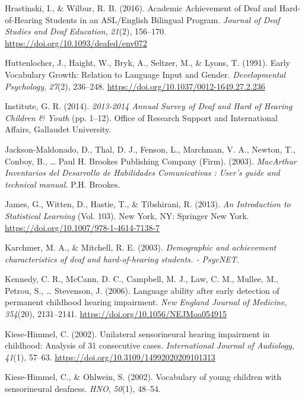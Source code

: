 \documentclass[english,man]{apa6}
\begin{document}
\leavevmode\hypertarget{ref-hrastinski2016}{}%
Hrastinski, I., \& Wilbur, R. B. (2016). Academic Achievement of Deaf and Hard-of-Hearing Students in an ASL/English Bilingual Program. \emph{Journal of Deaf Studies and Deaf Education}, \emph{21}(2), 156--170. \url{https://doi.org/10.1093/deafed/env072}

\leavevmode\hypertarget{ref-huttenlocher1991}{}%
Huttenlocher, J., Haight, W., Bryk, A., Seltzer, M., \& Lyons, T. (1991). Early Vocabulary Growth: Relation to Language Input and Gender. \emph{Developmental Psychology}, \emph{27}(2), 236--248. \url{https://doi.org/10.1037/0012-1649.27.2.236}

\leavevmode\hypertarget{ref-gallaudetresearchinstitute2014}{}%
Institute, G. R. (2014). \emph{2013-2014 Annual Survey of Deaf and Hard of Hearing Children \& Youth} (pp. 1--12). Office of Research Support and International Affairs, Gallaudet University.

\leavevmode\hypertarget{ref-jackson-maldonado2003}{}%
Jackson-Maldonado, D., Thal, D. J., Fenson, L., Marchman, V. A., Newton, T., Conboy, B., \ldots{} Paul H. Brookes Publishing Company (Firm). (2003). \emph{MacArthur Inventarios del Desarrollo de Habilidades Comunicativas : User's guide and technical manual}. P.H. Brookes.

\leavevmode\hypertarget{ref-james2013}{}%
James, G., Witten, D., Hastie, T., \& Tibshirani, R. (2013). \emph{An Introduction to Statistical Learning} (Vol. 103). New York, NY: Springer New York. \url{https://doi.org/10.1007/978-1-4614-7138-7}

\leavevmode\hypertarget{ref-karchmer2003}{}%
Karchmer, M. A., \& Mitchell, R. E. (2003). \emph{Demographic and achievement characteristics of deaf and hard-of-hearing students. - PsycNET}.

\leavevmode\hypertarget{ref-kennedy2006}{}%
Kennedy, C. R., McCann, D. C., Campbell, M. J., Law, C. M., Mullee, M., Petrou, S., \ldots{} Stevenson, J. (2006). Language ability after early detection of permanent childhood hearing impairment. \emph{New England Journal of Medicine}, \emph{354}(20), 2131--2141. \url{https://doi.org/10.1056/NEJMoa054915}

\leavevmode\hypertarget{ref-kiese-himmel2002}{}%
Kiese-Himmel, C. (2002). Unilateral sensorineural hearing impairment in childhood: Analysis of 31 consecutive cases. \emph{International Journal of Audiology}, \emph{41}(1), 57--63. \url{https://doi.org/10.3109/14992020209101313}

\leavevmode\hypertarget{ref-kiese-himmel2002a}{}%
Kiese-Himmel, C., \& Ohlwein, S. (2002). Vocabulary of young children with sensorineural deafness. \emph{HNO}, \emph{50}(1), 48--54.
\end{document}
